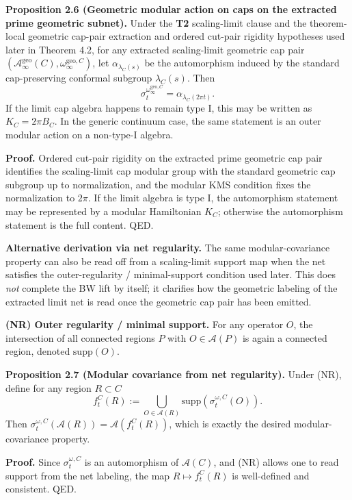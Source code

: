 \textbf{Proposition 2.6 (Geometric modular action on caps on the extracted prime geometric subnet).} Under the \textbf{T2} scaling-limit clause and the theorem-local geometric cap-pair extraction and ordered cut-pair rigidity hypotheses used later in Theorem 4.2, for any extracted scaling-limit geometric cap pair \((\mathcal A_\infty^{\mathrm{geo}}(C),\omega_\infty^{\mathrm{geo},C})\), let \(\alpha_{\lambda_C(s)}\) be the automorphism induced by the standard cap-preserving conformal subgroup \(\lambda_C(s)\). Then
\[
\sigma_t^{\omega_\infty^{\mathrm{geo},C}}
=
\alpha_{\lambda_C(2\pi t)}.
\]
If the limit cap algebra happens to remain type I, this may be written as \(K_C=2\pi B_C\). In the generic continuum case, the same statement is an outer modular action on a non-type-I algebra.

\textbf{Proof.} Ordered cut-pair rigidity on the extracted prime geometric cap pair identifies the scaling-limit cap modular group with the standard geometric cap subgroup up to normalization, and the modular KMS condition fixes the normalization to \(2\pi\). If the limit algebra is type I, the automorphism statement may be represented by a modular Hamiltonian \(K_C\); otherwise the automorphism statement is the full content. QED.

\textbf{Alternative derivation via net regularity.} The same modular-covariance property can also be read off from a scaling-limit support map when the net satisfies the outer-regularity / minimal-support condition used later. This does \emph{not} complete the BW lift by itself; it clarifies how the geometric labeling of the extracted limit net is read once the geometric cap pair has been emitted.

\textbf{(NR) Outer regularity / minimal support.} For any operator \(O\), the intersection of all connected regions \(P\) with \(O\in\mathcal A(P)\) is again a connected region, denoted \(\mathrm{supp}(O)\).

\textbf{Proposition 2.7 (Modular covariance from net regularity).} Under (NR), define for any region \(R\subset C\)
\[
f_t^C(R)
:=
\bigcup_{O\in \mathcal A(R)}
\mathrm{supp}\!\left(\sigma_t^{\omega,C}(O)\right).
\]
Then \(\sigma_t^{\omega,C}(\mathcal A(R))=\mathcal A(f_t^C(R))\), which is exactly the desired modular-covariance property.

\textbf{Proof.} Since \(\sigma_t^{\omega,C}\) is an automorphism of \(\mathcal A(C)\), and (NR) allows one to read support from the net labeling, the map \(R\mapsto f_t^C(R)\) is well-defined and consistent. QED.

